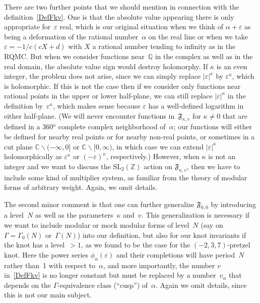 \documentclass[pdftex]{sigma}
\numberwithin{equation}{section}
\def\k{\kappa}
\def\SL{\mathrm{SL}}
\def\a{\alpha}
\def\C{\mathbb C}
\def\Z{\mathbb Z}
\def\Q{\mathbb Q}
\def\a{\alpha}
\def\G{\Gamma}
\def\v{\varepsilon}
\def\G{\Gamma}
\def\ssm{\smallsetminus}
\def\FF{\mathfrak F}
\begin{document}
There are two further points that we should mention in connection with the
definition~\eqref{DefFkv}. One is that the absolute value appearing there is only
appropriate for~$\v$ real, which is our original situation when we think of $\a+\v$
as being a deformation of the rational number~$\a$ on the real line or when we take
$\v=-1/c(cX+d)$ with $X$ a rational number tending to infinity as in the RQMC. But
when we consider functions near~$\Q$ in the complex as well as in the real domain, the
absolute value sign would destroy holomorphy. If $\k$ is an even integer, the problem
does not arise, since we can simply replace $|\v|^\k$ by $\v^\k$, which is
holomorphic. If this is not the case then if we consider only functions near
rational points in the upper or lower half-plane, we can still replace $|\v|^\k$
in the definition by~$\v^\k$, which makes sense because $\v$ has a well-defined
logarithm in either half-plane. (We will never encounter functions in~$\FF_{\k,v}$
for $\k\ne0$ that are defined in a 360$^o$ complete complex neighborhood of~$\a$;
our functions will either be defined for nearby real points or for nearby non-real
points, or sometimes in a cut plane $\C\ssm(-\infty,0]$ or $\C\ssm[0,\infty)$, in
which case we can extend $|\v|^\k$ holomorphically as $\v^\k$ or $(-\v)^\k$,
respectively.) However, when $\k$ is not an integer and we want to discuss
the $\SL_2(\Z)$ action on $\FF_{\k,v}$, then we have to include some kind
of multiplier system, as familiar from the theory of modular forms of arbitrary weight.
Again, we omit details.

The second minor comment is that one can further generalize $\FF_{0,0}$ by
introducing a level~$N$ as well as the parameters~$\k$ and~$v$. This generalization
is necessary if we want to include modular or mock modular forms of level~$N$ (say
on~$\G=\G_0(N)$ or~$\G(N)$) into our definition, but also for our knot invariants if
the knot has a level~$>1$, as we found to be the case for the $(-2,3,7)$-pretzel knot.
Here the power series $\phi_\a(\v)$ and their completions will have period~$N$ rather
than~1 with respect to~$\a$, and more importantly, the number $v$ in~\eqref{DefFkv} is
no longer constant but must be replaced by a number~$v_\a$ that depends on the
$\G$-equivalence class (``cusp'') of~$\a$. Again we omit details, since this is not
our main subject.
\end{document}
